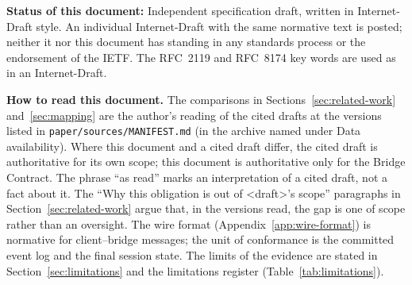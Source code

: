\textbf{Status of this document:} Independent specification draft, written in
Internet-Draft style. An individual Internet-Draft with the same normative
text is posted; neither it nor this document has standing in any standards
process or the endorsement of the IETF. The RFC~2119 and RFC~8174 key words are
used as in an Internet-Draft.

\medskip
\noindent\textbf{How to read this document.}
The comparisons in Sections~\ref{sec:related-work} and~\ref{sec:mapping}
are the author's reading of the cited drafts at the versions listed in
\texttt{paper/sources/MANIFEST.md} (in the archive named under Data availability). Where this document and a cited
draft differ, the cited draft is authoritative for its own scope; this
document is authoritative only for the Bridge Contract. The phrase
``as read'' marks an interpretation of a cited draft, not a fact about
it. The ``Why this obligation is out of <draft>'s scope'' paragraphs in
Section~\ref{sec:related-work} argue that, in the versions read, the gap is
one of scope rather than an oversight. The wire format (Appendix~\ref{app:wire-format}) is
normative for client--bridge messages; the unit of conformance is the
committed event log and the final session state. The limits of the
evidence are stated in Section~\ref{sec:limitations} and the
limitations register (Table~\ref{tab:limitations}).

